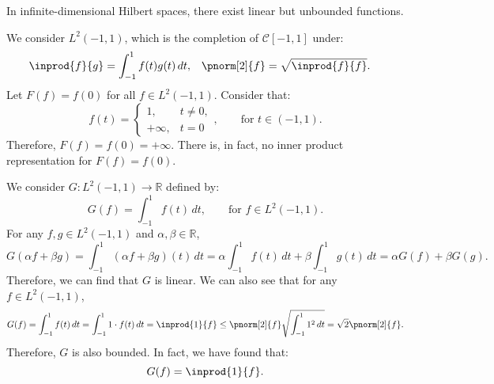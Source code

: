 \documentclass{huhtakm-template-book-v2}
\begin{document}
    \begin{rem}
        In infinite-dimensional Hilbert spaces, there exist linear but unbounded functions.
    \end{rem}
    \begin{eg}
        We consider $L^{2}(-1,1)$, which is the completion of $\mathcal{C}[-1,1]$ under:
        \begin{align*}
            \inprod{f}{g}&=\int_{-1}^{1}f(t)g(t)\,dt, & \pnorm[2]{f}&=\sqrt{\inprod{f}{f}}.
        \end{align*}
        Let $F(f)=f(0)$ for all $f\in L^{2}(-1,1)$. Consider that:
        \begin{equation*}
            f(t)=\begin{cases}
                1, &t\neq 0,\\
                +\infty, &t=0
            \end{cases}, \qquad \text{for } t\in(-1,1).
        \end{equation*}
        Therefore, $F(f)=f(0)=+\infty$. There is, in fact, no inner product representation for $F(f)=f(0)$.
    \end{eg}
    \begin{eg}
        We consider $G:L^{2}(-1,1)\to\mathbb{R}$ defined by:
        \begin{equation*}
            G(f)=\int_{-1}^{1}f(t)\,dt, \qquad \text{for } f\in L^{2}(-1,1).
        \end{equation*} 
        For any $f,g\in L^{2}(-1,1)$ and $\alpha,\beta\in\mathbb{R}$,
        \begin{equation*}
            G(\alpha f+\beta g)=\int_{-1}^{1}(\alpha f+\beta g)(t)\,dt=\alpha\int_{-1}^{1}f(t)\,dt+\beta\int_{-1}^{1}g(t)\,dt=\alpha G(f)+\beta G(g).
        \end{equation*}
        Therefore, we can find that $G$ is linear. We can also see that for any $f\in L^{2}(-1,1)$,
        \begin{equation*}
            G(f)=\int_{-1}^{1}f(t)\,dt=\int_{-1}^{1}1\cdot f(t)\,dt=\inprod{1}{f}\leq\pnorm[2]{f}\sqrt{\int_{-1}^{1}1^{2}\,dt}=\sqrt{2}\pnorm[2]{f}.
        \end{equation*}
        Therefore, $G$ is also bounded. In fact, we have found that:
        \begin{equation*}
            G(f)=\inprod{1}{f}.
        \end{equation*}
    \end{eg}
\end{document}
